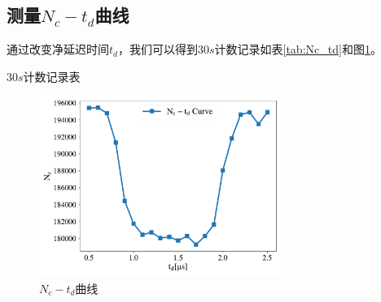 \documentclass{article}
\begin{document}
\subsection{测量$N_c-t_d$曲线}
通过改变净延迟时间$t_d$，我们可以得到$30\si{s}$计数记录如表\ref{tab:Nc_td}和图\ref{fig:Nc_td}。
\begin{table}[htbp]
    \centering
    \caption{$30\si{s}$计数记录表\label{tab:Nc_td}}
    
\end{table}
\begin{figure}[htbp]
    \centering
    \includegraphics[width=0.7\textwidth]{../plots/Nc_td.pdf}
    \caption{$N_c-t_d$曲线\label{fig:Nc_td}}
\end{figure}
\end{document}
